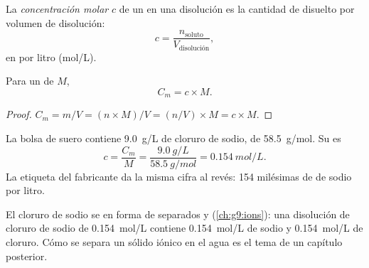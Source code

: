 \begin{definition}\label{def:g10:concentration-and-dilution:molar-concentration}
La \emph{concentración molar} $c$ de un
 en una disolución es la cantidad de  disuelto por volumen
de disolución:
\[
  c = \frac{n_{\text{soluto}}}{V_{\text{disolución}}},
\]
en  por litro (\si{mol/L}).
\end{definition}

\begin{proposition}\label{prop:g10:concentration-and-dilution:link}
Para un  de  $M$,
\[
  C_m = c \times M .
\]
\end{proposition}

\begin{proof}
$C_m = m / V = (n \times M) / V = (n / V) \times M = c \times M$.
\end{proof}

\begin{example}\label{ex:g10:concentration-and-dilution:drip}
La bolsa de suero contiene \qty{9.0}{g/L} de cloruro de sodio, de  \qty{58.5}{g/mol}. Su  es
\[
  c = \frac{C_m}{M} = \frac{\qty{9.0}{g/L}}{\qty{58.5}{g/mol}}
    = \qty{0.154}{mol/L}.
\]
La etiqueta del fabricante da la misma cifra al revés: 154 milésimas de
 de  sodio por litro.
\end{example}

\begin{remark}\label{rem:g10:concentration-and-dilution:ions}
El cloruro de sodio se  en forma de  separados  y
 (\cref{ch:g9:ions}): una disolución de cloruro de sodio de
\qty{0.154}{mol/L} contiene \qty{0.154}{mol/L} de  sodio y
\qty{0.154}{mol/L} de  cloruro. Cómo se separa un sólido iónico en
el agua es el tema de un capítulo posterior.
\end{remark}

